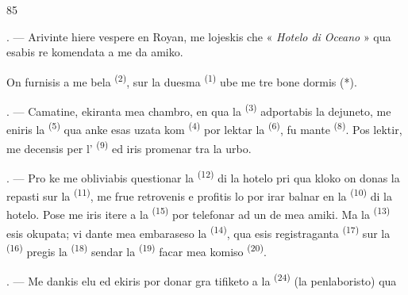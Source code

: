 \begin{VUpage}[87]{85}

\VUsaut{3.0mm}
\VUsaut{1.6mm}
\VUsaut{2.0mm}
\VUsaut{3.4mm}

. --- Arivinte hiere vespere en Royan, me\nl
lojeskis che « \textit{Hotelo di Oceano} » qua esabis re\cc
komendata a me da amiko.

\VUblancAlinea
On furnisis a me bela  \textsuperscript{(2)}, sur la\nl
duesma  \textsuperscript{(1)} ube me tre bone dormis (*).

. --- Camatine, ekiranta mea chambro, en\nl
qua la  \textsuperscript{(3)} adportabis la dejuneto,\nl
me eniris la  \textsuperscript{(5)} qua anke esas uzata\nl
kom  \textsuperscript{(4)} por lektar la  \textsuperscript{(6)}, fu\cc
mante  \textsuperscript{(8)}. Pos lektir, me decensis per\nl
l' \textsuperscript{(9)} ed iris promenar tra la urbo.

. --- Pro ke me obliviabis questionar la\nl
{} \textsuperscript{(12)} di la hotelo pri qua kloko on\nl
donas la repasti sur la  \textsuperscript{(11)}, me\nl
frue retrovenis e profitis lo por irar balnar en\nl
la  \textsuperscript{(10)} di la hotelo. Pose me iris itere\nl
a la  \textsuperscript{(15)} por telefonar ad un de mea\nl
amiki. Ma la  \textsuperscript{(13)} esis okupata; vi\cc
dante mea embaraseso la  \textsuperscript{(14)}, qua\nl
esis registraganta  \textsuperscript{(17)} sur la \cc
{} \textsuperscript{(16)} pregis la  \textsuperscript{(18)} sendar la\nl
{} \textsuperscript{(19)} facar mea komiso  \textsuperscript{(20)}.

. --- Me dankis elu ed ekiris por donar gra\cc
tifiketo a la  \textsuperscript{(24)} (la penlaboristo) qua
\parplein
\end{VUpage}

